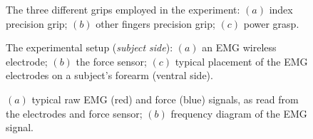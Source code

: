 \documentclass[10pt]{bmc_article}
\def\texttt{[image: ]}
\newenvironment{bmcformat}{\begin{raggedright}\baselineskip20pt\sloppy\setboolean{publ}{false}}{\end{raggedright}\baselineskip20pt\sloppy}
\begin{document}
\begin{bmcformat}
\begin{figure}[!t] \centering
  \caption{The three different grips employed in the experiment: $(a)$
   index precision grip; $(b)$ other fingers precision grip; $(c)$
   power grasp.}
  \label{fig:Grasps}
\end{figure}

\begin{figure}[!ht] \centering
  \caption{The experimental setup (\textit{subject side}): $(a)$ an EMG
    wireless electrode; $(b)$ the force sensor; $(c)$ typical
    placement of the EMG electrodes on a subject's forearm (ventral side).}
  \label{fig:SubjSetup}
\end{figure}


\begin{figure}[!ht] \centering
  \caption{$(a)$ typical raw EMG (red) and force (blue) signals, as read from the
    electrodes and force sensor; $(b)$ frequency diagram of the EMG signal.}
  \label{fig:spectra}
\end{figure}


\end{bmcformat}
\end{document}
